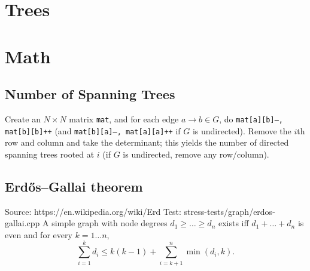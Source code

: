 \section{Trees}

\section{Math}
	\subsection{Number of Spanning Trees}
		Create an $N\times N$ matrix \texttt{mat}, and for each edge $a \rightarrow b \in G$, do
		\texttt{mat[a][b]--, mat[b][b]++} (and \texttt{mat[b][a]--, mat[a][a]++} if $G$ is undirected).
		Remove the $i$th row and column and take the determinant; this yields the number of directed spanning trees rooted at $i$
		(if $G$ is undirected, remove any row/column).

	\subsection{Erdős–Gallai theorem}
		Source: https://en.wikipedia.org/wiki/Erd%
		Test: stress-tests/graph/erdos-gallai.cpp
		A simple graph with node degrees $d_1 \ge \dots \ge d_n$ exists iff $d_1 + \dots + d_n$ is even and for every $k = 1\dots n$,
		\[ \sum _{i=1}^{k}d_{i}\leq k(k-1)+\sum _{i=k+1}^{n}\min(d_{i},k). \]
